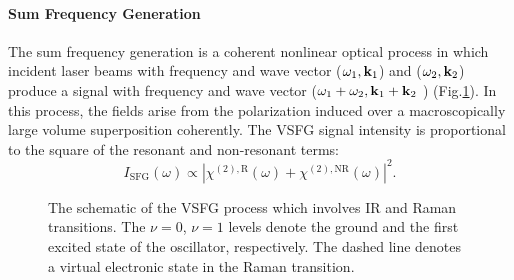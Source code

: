 \paragraph{Sum Frequency Generation}
The sum frequency generation is a coherent nonlinear optical process in which incident laser beams with frequency and wave vector 
($\omega_1, {\bf k}_1$) and ($\omega_2, {\bf k}_2$) produce a signal with frequency and wave vector
($\omega_1+\omega_2, {\bf k}_1+{\bf k}_2$ ) (Fig.\thinspace\ref{fig:sfg_1a}). 
In this process, the  fields arise from the polarization induced over a macroscopically large volume superposition coherently.
%
The VSFG signal intensity is proportional to the square of the resonant and non-resonant terms:
\begin{equation}
  I_{\text{SFG}}(\omega) \varpropto |\chi^{(2),\text{R}}(\omega)+\chi^{(2),\text{NR}}(\omega)|^2.
\label{eq:I_SFG}
\end{equation}
\begin{figure}[h]
\centering
{}
\caption{The schematic of the VSFG process which involves IR and Raman transitions. The $\nu =0$, $\nu=1$ levels denote the ground and the first excited state of the oscillator, respectively.
 The dashed line denotes a virtual electronic state in the Raman transition.}\label{fig:sfg_1a}
\end{figure}

